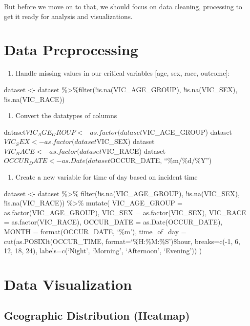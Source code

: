 \documentclass[
]{article}
\providecommand{\tightlist}{%
  \setlength{\itemsep}{0pt}\setlength{\parskip}{0pt}}
\begin{document}
But before we move on to that, we should focus on data cleaning,
processing to get it ready for analysis and visualizations.

\section{Data Preprocessing}\label{data-preprocessing}

\begin{enumerate}
\def\labelenumi{\arabic{enumi}.}
\tightlist
\item
  Handle missing values in our critical variables {[}age, sex, race,
  outcome{]}:
\end{enumerate}

dataset \textless- dataset
\%\textgreater\%filter(!is.na(VIC\_AGE\_GROUP), !is.na(VIC\_SEX),
!is.na(VIC\_RACE))

\begin{enumerate}
\def\labelenumi{\arabic{enumi}.}
\setcounter{enumi}{1}
\tightlist
\item
  Convert the datatypes of columns
\end{enumerate}

dataset\(VIC_AGE_GROUP <- as.factor(dataset\)VIC\_AGE\_GROUP)
dataset\(VIC_SEX <- as.factor(dataset\)VIC\_SEX)
dataset\(VIC_RACE <- as.factor(dataset\)VIC\_RACE)
dataset\(OCCUR_DATE <- as.Date(dataset\)OCCUR\_DATE, ``\%m/\%d/\%Y'')

\begin{enumerate}
\def\labelenumi{\arabic{enumi}.}
\setcounter{enumi}{2}
\tightlist
\item
  Create a new variable for time of day based on incident time
\end{enumerate}

dataset \textless- dataset \%\textgreater\%
filter(!is.na(VIC\_AGE\_GROUP), !is.na(VIC\_SEX), !is.na(VIC\_RACE))
\%\textgreater\% mutate( VIC\_AGE\_GROUP = as.factor(VIC\_AGE\_GROUP),
VIC\_SEX = as.factor(VIC\_SEX), VIC\_RACE = as.factor(VIC\_RACE),
OCCUR\_DATE = as.Date(OCCUR\_DATE), MONTH = format(OCCUR\_DATE, `\%m'),
time\_of\_day = cut(as.POSIXlt(OCCUR\_TIME, format=`\%H:\%M:\%S')\$hour,
breaks=c(-1, 6, 12, 18, 24), labels=c(`Night', `Morning', `Afternoon',
`Evening')) )

\section{Data Visualization}\label{data-visualization}

\subsection{Geographic Distribution
(Heatmap)}\label{geographic-distribution-heatmap}
\end{document}
